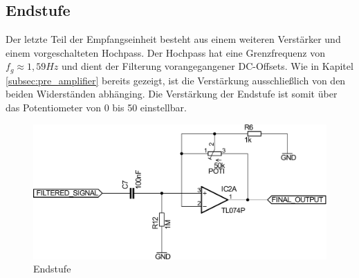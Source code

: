 \subsection{Endstufe}
Der letzte Teil der Empfangseinheit besteht aus einem weiteren Verstärker und einem vorgeschalteten Hochpass. Der Hochpass hat eine Grenzfrequenz von $f_{g} \approx 1,59Hz$ und dient der Filterung vorangegangener DC-Offsets. Wie in Kapitel \ref{subsec:pre_amplifier} bereits gezeigt, ist die Verstärkung ausschließlich von den beiden Widerständen abhänging. Die Verstärkung der Endstufe ist somit über das Potentiometer von 0 bis 50 einstellbar.
\begin{figure}[H]
	\centering
	\includegraphics[scale=0.5]{gfx/post_amplifier.pdf}
	\caption{Endstufe}
\end{figure}